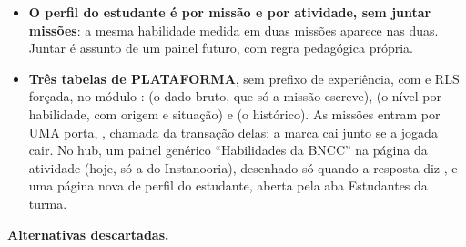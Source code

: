 \begin{itemize}
{    ranking.} Os quatro papéis de gestão,  incluído, leem o painel e o
    perfil e recebem 403 no confirmar e no ajustar --- administrar a escola não é
    dar a aula. O que eles leem é NÍVEL por habilidade, nunca texto: a evidência
    não guarda nada que a criança escreveu. Não existe rota em que o estudante leia a própria evidência. A
    ordem dos estudantes é a alfabética, e nenhum campo soma níveis numa nota:
    o nível é de uma habilidade, não da criança.
  \item \textbf{O perfil do estudante é por missão e por atividade, sem juntar
    missões}: a mesma habilidade medida em duas missões aparece nas duas.
    Juntar é assunto de um painel futuro, com regra pedagógica própria.
  \item \textbf{Três tabelas de PLATAFORMA}, sem prefixo de experiência, com
     e RLS forçada, no módulo :
     (o dado bruto, que só a missão escreve),
     (o nível por habilidade, com origem e situação) e
     (o histórico). As missões entram por UMA porta,
    , chamada da transação delas: a
    marca cai junto se a jogada cair. No hub, um painel genérico
    \enquote{Habilidades da BNCC} na página da atividade (hoje, só a do
    Instanooria), desenhado só quando a resposta diz , e uma
    página nova de perfil do estudante, aberta pela aba Estudantes da turma.
\end{itemize}

\textbf{Alternativas descartadas.}

